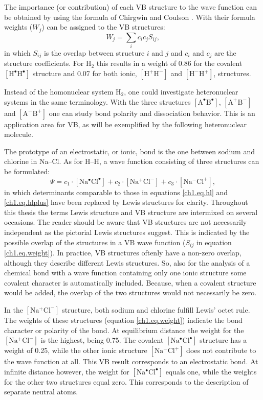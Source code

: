 The importance (or contribution) of each VB structure to the wave function can be obtained by using the formula of Chirgwin and Coulson \cite{chirgwin}. With their formula weights ($W_j$) can be assigned to the VB structures:
\begin{equation}
W_{j}=\sum_{i} c_{i}c_{j}S_{ij},
\label{ch1.eq.weight}
\end{equation}
in which $S_{ij}$ is the overlap between structure $i$ and $j$ and $c_i$ and $c_j$ are the structure coefficients. For H$_2$ this results in a weight of 0.86 for the covalent $\mathrm{[H^\bullet H^\bullet]}$ structure and 0.07 for both ionic, $\mathrm{[H^{+} H^{-}]}$ and $\mathrm{[H^{-} H^{+}]}$, structures. 

Instead of the homonuclear system H$_2$, one could investigate heteronuclear systems in the same terminology. With the three structures $\mathrm{[A^\bullet B^\bullet]}$, $\mathrm{[A^{+} B^{-}]}$ and $\mathrm{[A^{-} B^{+}]}$ one can study bond polarity and dissociation behavior. This is an application area for VB, as will be exemplified by the following heteronuclear molecule.

The prototype of an electrostatic, or ionic, bond is the one between sodium and chlorine in \mbox{Na--Cl}. As for H--H, a wave function consisting of three structures can be formulated:
\begin{equation}
\Psi = c_1 \cdot \mathrm{[Na^\bullet Cl^\bullet]} + c_2 \cdot \mathrm{[Na^{+} Cl^{-}]} + c_3 \cdot \mathrm{[Na^{-} Cl^{+}]},
\label{ch1.eq.nacl}
\end{equation}
in which determinants comparable to those in equations \ref{ch1.eq.hl} and \ref{ch1.eq.hlplus} have been replaced by Lewis structures for clarity. Throughout this thesis the terms Lewis structure and VB structure are intermixed on several occasions. The reader should be aware that VB structures are not necessarily independent as the pictorial Lewis structures suggest. This is indicated by the possible overlap of the structures in a VB wave function ($S_{ij}$ in equation \ref{ch1.eq.weight}). In practice, VB structures oftenly have a non-zero overlap, although they describe different Lewis structures. So, also for the analysis of a chemical bond with a wave function containing only one ionic structure some covalent character is automatically included. Because, when a covalent structure would be added, the overlap of the two structures would not necessarily be zero.

In the $\mathrm{[Na^{+} Cl^{-}]}$ structure, both sodium and chlorine fulfill Lewis' octet rule. The weights of these structures (equation \ref{ch1.eq.weight}) indicate the bond character or polarity of the bond. At equilibrium distance the weight for the $\mathrm{[Na^{+} Cl^{-}]}$ is the highest, being 0.75. The covalent $\mathrm{[Na^\bullet Cl^\bullet]}$ structure has a weight of 0.25, while the other ionic structure $\mathrm{[Na^{-} Cl^{+}]}$ does not contribute to the wave function at all. This VB result corresponds to an electrostatic bond. At infinite distance however, the weight for \mbox{$\mathrm{[Na^\bullet Cl^\bullet]}$} equals one, while the weights for the other two structures equal zero. This corresponds to the description of separate neutral atoms.

